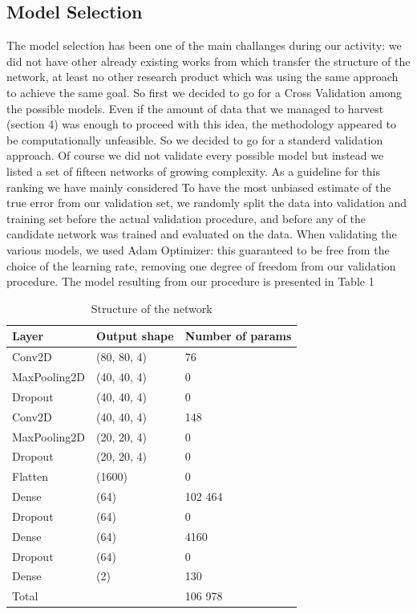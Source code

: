 \subsection{Model Selection}
The model selection has been one of the main challanges during our activity: we did not have other already existing works from which transfer the structure of the network, at least no other research product which was using the same approach to achieve the same goal. So first we decided to go for a Cross Validation among the possible models. Even if the amount of data that we managed to harvest (section 4) was enough to proceed with this idea, the methodology appeared to be computationally unfeasible. So we decided to go for a standerd validation approach. Of course we did not validate every possible model but instead we listed a set of fifteen networks of growing complexity. As a guideline for this ranking we have mainly considered 
To have the most unbiased estimate of the true error from our validation set, we randomly split the data into validation and training set before the actual validation procedure, and before any of the candidate network was trained and evaluated on the data.
When validating the various models, we used Adam Optimizer: this guaranteed to be free from the choice of the learning rate, removing one degree of freedom from our validation procedure.
The model resulting from our procedure is presented in Table 1
\\
\begin{table}[]
\label{tab:model}
\begin{center}
\begin{tabular}{l|l|l}
Layer        & Output shape & Number of params \\
\hline
Conv2D       & (80, 80, 4)  & 76               \\
\hline
MaxPooling2D & (40, 40, 4)  & 0                \\
\hline
Dropout      & (40, 40, 4)  & 0                \\
\hline
Conv2D       & (40, 40, 4)  & 148              \\
\hline
MaxPooling2D & (20, 20, 4)  & 0                \\
\hline
Dropout      & (20, 20, 4)  & 0                \\
\hline
Flatten      & (1600)         & 0                \\
\hline
Dense        & (64)           & 102 464          \\
\hline
Dropout      & (64)           & 0                \\
\hline
Dense        & (64)           & 4160             \\
\hline
Dropout      & (64)           & 0                \\
\hline
Dense        & (2)            & 130              \\
\hline
\multicolumn{2}{l}{Total}   & 106 978         
\end{tabular}
\end{center}
\caption{Structure of the network}
\end{table}
